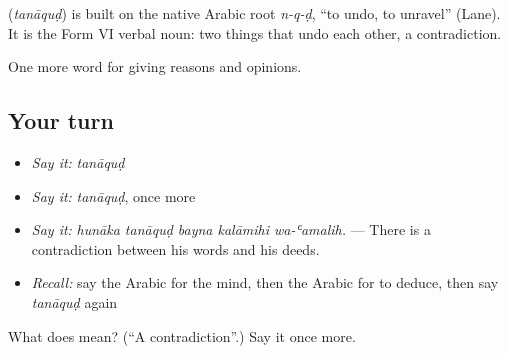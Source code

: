 \begin{cousinweb}
\textbf{} (\emph{tanāquḍ}) is built on the native Arabic root \emph{n-q-ḍ}, \textquotedblleft{}to undo, to unravel\textquotedblright{} (Lane). It is the Form VI verbal noun: two things that undo each other, a contradiction.
\end{cousinweb}

\begin{grammarlens}[title={What you've built}]
One more word for giving reasons and opinions.
\end{grammarlens}

\subsection*{Your turn}
\begin{itemize}
\raggedright
  \item \emph{Say it:} \emph{tanāquḍ}
  \item \emph{Say it:} \emph{tanāquḍ}, once more
  \item \emph{Say it:} \emph{hunāka tanāquḍ bayna kalāmihi wa-ʿamalih.} — There is a contradiction between his words and his deeds.
  \item \emph{Recall:} say the Arabic for the mind, then the Arabic for to deduce, then say \emph{tanāquḍ} again
\end{itemize}

\begin{tcolorbox}[breakable,colback=teal!4,colframe=teal!35!black,title={Before you move on}]
What does  mean? (\textquotedblleft{}A contradiction\textquotedblright{}.) Say it once more.
\end{tcolorbox}
